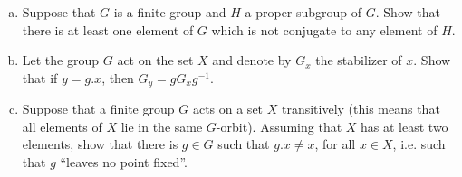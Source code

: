 \documentclass{article}
\newcounter{Problem}
\newenvironment{Problem}{\begin{Exercise}[name={Problem},
                                          counter={Problem}]}
                        {\end{Exercise}}
\begin{document}
\pagebreak
\begin{Problem}
\begin{enumerate}[(a)]
  \item{Suppose that $G$ is a finite group and $H$ a proper subgroup
      of $G$. Show that there is at least one element of $G$ which is
      not conjugate to any element of $H$.}
  \item{Let the group $G$ act on the set $X$ and denote by $G_x$ the
      stabilizer of $x$. Show that if $y = g . x$, then $G_y = g
      G_x g^{-1}$.}
  \item{Suppose that a finite group $G$ acts on a set $X$ transitively
      (this means that all elements of $X$ lie in the same
      $G$-orbit). Assuming that $X$ has at least two elements, show
      that there is $g \in G$ such that $g . x \neq x$, for all $x
      \in X$, 
      i.e. such that $g$ ``leaves no point fixed''.}
\end{enumerate}
\end{Problem}
\end{document}
